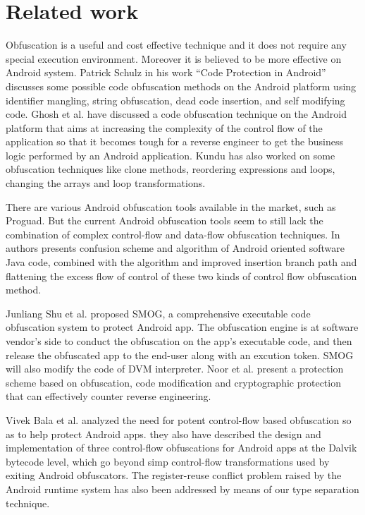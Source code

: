 \section{Related work}
Obfuscation is a useful and cost effective technique and it does not require any special execution environment. Moreover it is believed to be more effective on Android system\cite{21,22}. Patrick Schulz in his work “Code Protection in Android”\cite{20} discusses some possible code obfuscation methods on the Android platform using identifier mangling, string obfuscation, dead code insertion, and self modifying code. Ghosh et al.\cite{23} have discussed a code obfuscation technique on the Android platform that aims at increasing the complexity of the control flow of the application so that it becomes tough for a reverse engineer to get the business logic performed by an Android application. Kundu has also worked on some obfuscation techniques like clone methods, reordering expressions and loops, changing the arrays and loop transformations\cite{24}.

There are various Android obfuscation tools available in the market, such as Proguad\cite{09}. But the current Android obfuscation tools seem to still lack the combination of complex control-flow and data-flow obfuscation techniques. In \cite{06,07,08} authors presents confusion scheme and algorithm of Android oriented software Java code, combined with the algorithm and improved insertion branch path and flattening the excess flow of control of these two kinds of control flow obfuscation method.

Junliang Shu et al. proposed SMOG\cite{10}, a comprehensive executable code obfuscation system to protect Android app. The obfuscation engine is at software vendor's side to conduct the obfuscation on the app's executable code, and then release the obfuscated app to the end-user along with an excution token. SMOG will also modify the code of DVM interpreter. Noor et al.\cite{26} present a protection scheme based on obfuscation, code modification and cryptographic protection that can effectively counter reverse engineering.

Vivek Bala et al.\cite{27} analyzed the need for potent control-flow based obfuscation so as to help protect Android apps. they also have described the design and implementation of three control-flow obfuscations for Android apps at the Dalvik bytecode level, which go beyond simp control-flow transformations used by exiting Android obfuscators. The register-reuse conflict problem raised by the Android runtime system has also been addressed by means of our type separation technique.
